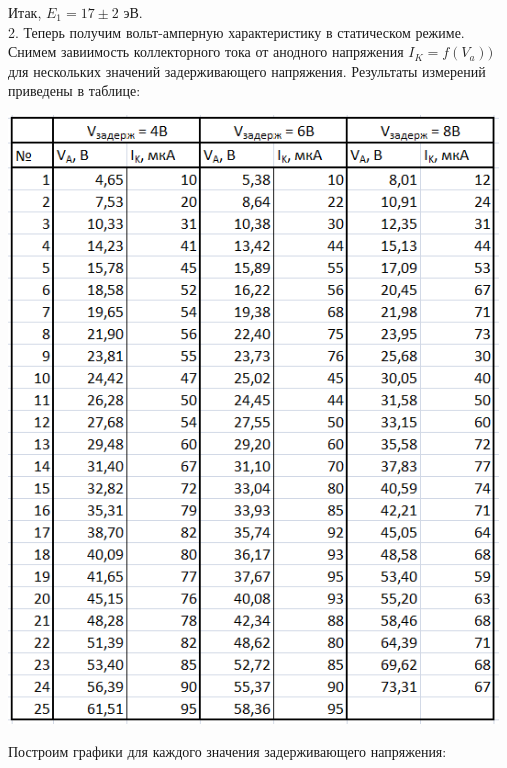 \documentclass[12pt]{article}
\begin{document}
    Итак, $E_1 = 17 \pm 2$ эВ.\\
    
    2. Теперь получим вольт-амперную характеристику в статическом режиме. Снимем завиимость коллекторного тока от анодного напряжения $I_K = f(V_a))$ для нескольких значений задерживающего напряжения. Результаты измерений приведены в таблице:
    
    \begin{center}
    	\includegraphics[width=13cm]{table2.png}
    \end{center}
    
    Построим графики для каждого значения задерживающего напряжения:
    
\end{document}
